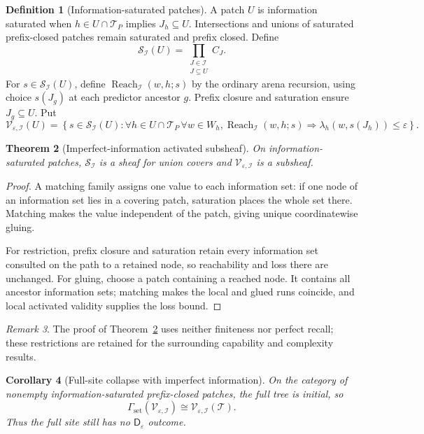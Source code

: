 \documentclass[11pt]{article}
\theoremstyle{plain}
\newtheorem{theorem}{Theorem}[section]
\newtheorem{corollary}[theorem]{Corollary}
\theoremstyle{definition}
\newtheorem{definition}[theorem]{Definition}
\theoremstyle{remark}
\newtheorem{remark}[theorem]{Remark}
\newcommand{\eps}{\varepsilon}
\begin{document}
\begin{definition}[Information-saturated patches]\label{def:ii-patch}
A patch $U$ is information saturated when
$h\in U\cap\mathcal T_P$ implies $J_h\subseteq U$. Intersections and unions of
saturated prefix-closed patches remain saturated and prefix closed. Define
\[
\mathscr S_{\mathcal I}(U)
=\prod_{\substack{J\in\mathcal I\\J\subseteq U}}C_J.
\]
For $s\in\mathscr S_{\mathcal I}(U)$, define
$\operatorname{Reach}_{\mathcal I}(w,h;s)$ by the ordinary arena recursion,
using choice $s(J_g)$ at each predictor ancestor $g$. Prefix closure and
saturation ensure $J_g\subseteq U$. Put
\[
\mathscr V_{\eps,\mathcal I}(U)
=\left\{s\in\mathscr S_{\mathcal I}(U):
\forall h\in U\cap\mathcal T_P\,\forall w\in W_h,
\operatorname{Reach}_{\mathcal I}(w,h;s)
\Rightarrow
\lambda_h(w,s(J_h))\le\eps
\right\}.
\]
\end{definition}

\begin{theorem}[Imperfect-information activated subsheaf]\label{thm:ii-sheaf}
On information-saturated patches, $\mathscr S_{\mathcal I}$ is a sheaf for union
covers and $\mathscr V_{\eps,\mathcal I}$ is a subsheaf.
\end{theorem}

\begin{proof}
A matching family assigns one value to each information set: if one node of an
information set lies in a covering patch, saturation places the whole set there.
Matching makes the value independent of the patch, giving unique coordinatewise
gluing.

For restriction, prefix closure and saturation retain every information set
consulted on the path to a retained node, so reachability and loss there are
unchanged. For gluing, choose a patch containing a reached node. It contains all
ancestor information sets; matching makes the local and glued runs coincide, and
local activated validity supplies the loss bound.
\end{proof}

\begin{remark}
The proof of Theorem~\ref{thm:ii-sheaf} uses neither finiteness nor perfect
recall; these restrictions are retained for the surrounding capability and
complexity results.
\end{remark}


\begin{corollary}[Full-site collapse with imperfect information]
\label{cor:ii-collapse}
On the category of nonempty information-saturated prefix-closed patches, the
full tree is initial, so
\[
\Gamma_{\mathrm{set}}(\mathscr V_{\eps,\mathcal I})
\cong\mathscr V_{\eps,\mathcal I}(\mathcal T).
\]
Thus the full site still has no $\mathsf D_\eps$ outcome.
\end{corollary}
\end{document}
